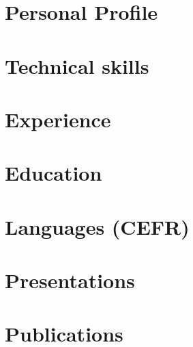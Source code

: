 \documentclass[11pt,a4paper,sans]{moderncv}
\begin{document}
\makecvtitle

\section{Personal Profile}


\section{Technical skills}


\section{Experience}


\section{Education}


\section{Languages (CEFR)}
 

\pagebreak

\section{Presentations}


\section{Publications}




\end{document}
